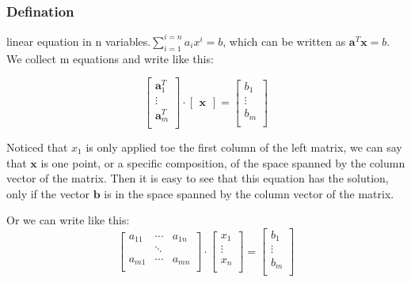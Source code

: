 \documentclass[UTF8]{../../09-Mathematics}
\begin{document}
\subsubsection{Defination}

linear equation in n variables.$\sum_{i = 1}^{i=n}a_ix^i = b$, which can be written as $\boldsymbol a^T \boldsymbol x = b$. We collect m equations and write like this:

\begin{equation}
  \begin{bmatrix}
    \boldsymbol a^T_1 \\
    \vdots \\
    \boldsymbol a^T_m \\
  \end{bmatrix}
  \cdot
  \begin{bmatrix}
    \boldsymbol x
  \end{bmatrix}
  =
  \begin{bmatrix}
     b_1 \\
    \vdots \\
     b_m \\
  \end{bmatrix}
\end{equation}

Noticed that $x_1$ is only applied toe the first column of the left matrix, we can say that $ \boldsymbol x$ is one point, or a specific composition, of the space spanned by the column vector of the matrix. Then it is easy to see that this equation has the solution, only if the vector $ \boldsymbol b$ is in the space spanned by the column vector of the matrix.


Or we can write like this:
\begin{equation}
  \begin{bmatrix}
     a_{11} & \cdots & a_{1n}\\
     & \ddots & \\
     a_{m1} & \cdots & a_{mn} \\
  \end{bmatrix}
  \cdot
  \begin{bmatrix}
    x_1 \\
    \vdots \\
    x_n \\
  \end{bmatrix}
  =
  \begin{bmatrix}
    b_1 \\
    \vdots \\
    b_m \\
  \end{bmatrix}
\end{equation}
\end{document}
